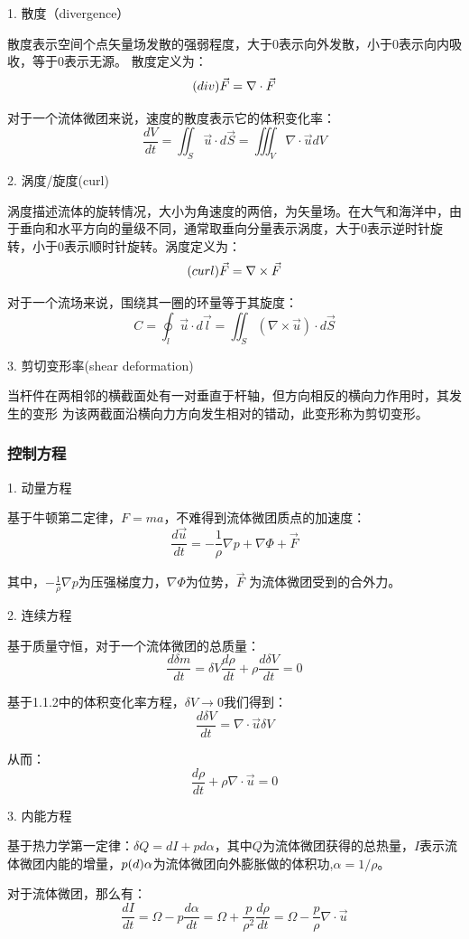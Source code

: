 \documentclass{article}
\begin{document}
1. 散度（divergence）

散度表示空间个点矢量场发散的强弱程度，大于$0$表示向外发散，小于$0$表示向内吸收，等于$0$表示无源。
散度定义为：$$\text(div) \vec{F} = \nabla\cdot\vec{F}$$

对于一个流体微团来说，速度的散度表示它的体积变化率：
$$\frac{dV}{dt} = \iint_S \vec{u}\cdot d\vec{S} = \iiint_V \nabla\cdot\vec{u} dV$$

2. 涡度/旋度(curl)

涡度描述流体的旋转情况，大小为角速度的两倍，为矢量场。在大气和海洋中，由于垂向和水平方向的量级不同，通常取垂向分量表示涡度，大于$0$表示逆时针旋转，小于$0$表示顺时针旋转。涡度定义为：
$$\text(curl) \vec{F} = \nabla \times \vec{F}$$

对于一个流场来说，围绕其一圈的环量等于其旋度：
$$C = \oint_l \vec{u}\cdot d\vec{l} = \iint_S (\nabla\times\vec{u})\cdot d\vec{S}$$

3. 剪切变形率(shear deformation)

当杆件在两相邻的横截面处有一对垂直于杆轴，但方向相反的横向力作用时，其发生的变形
为该两截面沿横向力方向发生相对的错动，此变形称为剪切变形。

\subsubsection{控制方程}

1. 动量方程

基于牛顿第二定律，$F=ma$，不难得到流体微团质点的加速度：
$$\frac{d\vec{u}}{dt} = -\frac{1}{\rho}\nabla p + \nabla\Phi+\vec{F}$$

其中，$-\frac{1}{\rho}\nabla p$为压强梯度力，$\nabla\Phi$为位势，$\vec{F}$ 为流体微团受到的合外力。

2. 连续方程

基于质量守恒，对于一个流体微团的总质量：
$$\frac{d\delta m}{dt} = \delta V\frac{d\rho}{dt} +\rho\frac{d\delta V}{dt}=0$$

基于1.1.2中的体积变化率方程，$\delta V \rightarrow 0$我们得到：
$$\frac{d\delta V}{dt} = \nabla\cdot\vec{u} \delta V$$

从而：
$$\frac{d\rho}{dt} +\rho\nabla\cdot\vec{u}=0$$

3. 内能方程

基于热力学第一定律：$\delta Q = dI + pd\alpha$，其中$Q$为流体微团获得的总热量，$I$表示流体微团内能的增量，$p\text(d)\alpha$为流体微团向外膨胀做的体积功,$\alpha = 1/\rho$。

对于流体微团，那么有：$$\frac{dI}{dt} = \Omega - p\frac{d\alpha}{dt} 
= \Omega + \frac{p}{\rho^2}\frac{d\rho}{dt}
=\Omega - \frac{p}{\rho}\nabla\cdot\vec{u}$$
\end{document}
